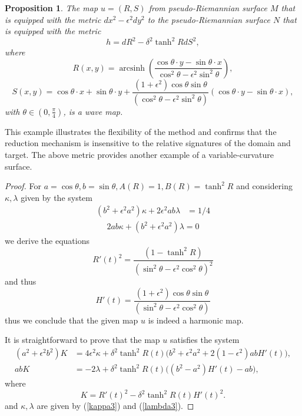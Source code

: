 \documentclass[12pt]{amsart}
\newtheorem{proposition}[theorem]{Proposition}
\begin{document}
\begin{proposition}
		The map $u=(R,S)$ from pseudo-Riemannian surface $M$ that is equipped with the metric $dx^2-\epsilon^2 dy^2$ to the pseudo-Riemannian surface $N$ that is equipped with the metric  
		\[
		h=dR^2 -\delta^2\tanh^2R dS^2,
		\]
		where 
		\[
		R(x,y) = \operatorname{arcsinh}
		\left(
		\frac
		{\cos{\theta}\cdot y-\sin{\theta} \cdot x}
		{\cos^2{\theta} - \epsilon^2\sin^2{\theta} }
		\right),
		\]
		\[
		S(x,y) = \cos{\theta}\cdot x+\sin{\theta}\cdot y+\frac{(1+\epsilon^2)\cos{\theta}\sin{\theta}}
		{(\cos^2{\theta} - \epsilon^2\sin^2{\theta}) }
		(\cos{\theta} \cdot y-\sin{\theta}\cdot x),
		\]
		with $\theta \in (0,\frac{\pi}{4})$, is a wave map.
	\end{proposition}
	This example illustrates the flexibility of the method and confirms that the reduction mechanism is insensitive to the relative signatures of the domain and target. The above metric provides another example of a variable-curvature surface.
	
	\begin{proof}
For $a=\cos{\theta}, b=\sin{\theta}, A(R)=1, B(R)=\tanh^2{R}$ and considering $\kappa, \lambda$ given by the system
	\begin{align}\label{kappa3}
		(b^2+\epsilon^2 a^2)\kappa+2\epsilon^2 ab\lambda &=1/4
	\end{align}
	\begin{align}\label{lambda3}
		2ab\kappa+(b^2+\epsilon^2 a^2)\lambda =0
	\end{align}
	we derive the equations
	\[
	R'(t)^2 = 
	\frac{(1-\tanh^2{R})}{(\sin^2{\theta}-\epsilon^2 \cos^2{\theta})^2}
	\]
	and thus
	\[
	H'(t)=\frac{(1+\epsilon^2)\cos{\theta}\sin{\theta}}{(\sin^2{\theta}-\epsilon^2 \cos^2{\theta})}
	\]
	thus we conclude that the given map $u$ is indeed a harmonic map. 
	
	
	
	
	It is straightforward to prove that the map $u$ satisfies the system
	\begin{align*}
		(a^{2}+\epsilon^{2}b^{2})K
		&=
		4\epsilon^{2}\kappa
		+\delta^{2}\tanh^2{R(t)}\big(b^{2}+\epsilon^{2}a^{2}+2(1-\epsilon^{2})abH'(t)\big),\\[0.3em]
		abK
		&=
		-2\lambda
		+\delta^{2} \tanh^2{R(t)}\big( (b^{2}-a^{2})H'(t) - ab\big),
	\end{align*}
	where
	\[
	K = R'(t)^{2}-\delta^{2}\tanh^2{R(t)}H'(t)^{2}.
	\]
	and $\kappa, \lambda$ are given by (\ref{kappa3}) and (\ref{lambda3}).
\end{proof}
\end{document}
